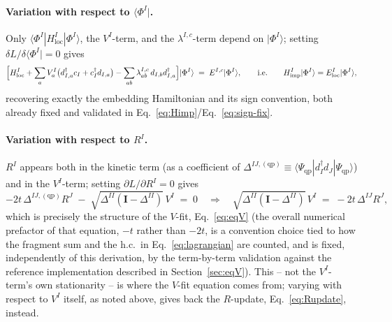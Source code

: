 \documentclass[11pt]{article}
\newcommand{\Himp}{H_{\mathrm{imp}}}
\newcommand{\Hloc}{H_{\mathrm{loc}}}
\begin{document}
\paragraph{Variation with respect to $\langle\Phi^I|$.} Only
$\langle\Phi^I|\Hloc^I|\Phi^I\rangle$, the $V^I$-term, and the
$\lambda^{I,c}$-term depend on $|\Phi^I\rangle$; setting
$\delta L/\delta\langle\Phi^I| = 0$ gives
\begin{equation}
  \Bigl[\Hloc^I + \sum_a V^I_a\bigl(d^{\dagger}_{I,a}c_I+c^{\dagger}_Id_{I,a}\bigr)
       - \sum_{ab}\lambda^{I,c}_{ab}\,d_{I,b}d^{\dagger}_{I,a}\Bigr]|\Phi^I\rangle
  \;=\; E^{I,c}|\Phi^I\rangle, \qquad\text{i.e.}\qquad \Himp^I|\Phi^I\rangle = E^I_{\mathrm{loc}}|\Phi^I\rangle,
\end{equation}
recovering exactly the embedding Hamiltonian and its sign convention, both
already fixed and validated in Eq.~\eqref{eq:Himp}/Eq.~\eqref{eq:sign-fix}.

\paragraph{Variation with respect to $R^I$.} $R^I$ appears both in the
kinetic term (as a coefficient of $\Delta^{IJ,(\mathrm{qp})}\equiv
\langle\Psi_{\mathrm{qp}}|d^{\dagger}_Id_J|\Psi_{\mathrm{qp}}\rangle$) and in
the $V^I$-term; setting $\partial L/\partial R^I=0$ gives
\begin{equation}
  -2t\,\Delta^{IJ,(\mathrm{qp})}R^J \;-\; \sqrt{\Delta^{II}(\mathbf{I}-\Delta^{II})}\,V^I \;=\; 0
  \quad\Longrightarrow\quad
  \sqrt{\Delta^{II}(\mathbf{I}-\Delta^{II})}\,V^I \;=\; -2t\,\Delta^{IJ}R^J,
\end{equation}
which is precisely the structure of the $V$-fit, Eq.~\eqref{eq:eqV} (the
overall numerical prefactor of that equation, $-t$ rather than $-2t$, is a
convention choice tied to how the fragment sum and the h.c.\ in
Eq.~\eqref{eq:lagrangian} are counted, and is fixed, independently of this
derivation, by the term-by-term validation against the reference
implementation described in Section~\ref{sec:eqV}). This -- not the
$V^I$-term's own stationarity -- is where the $V$-fit equation comes from;
varying with respect to $V^I$ itself, as noted above, gives back the
$R$-update, Eq.~\eqref{eq:Rupdate}, instead.
\end{document}
